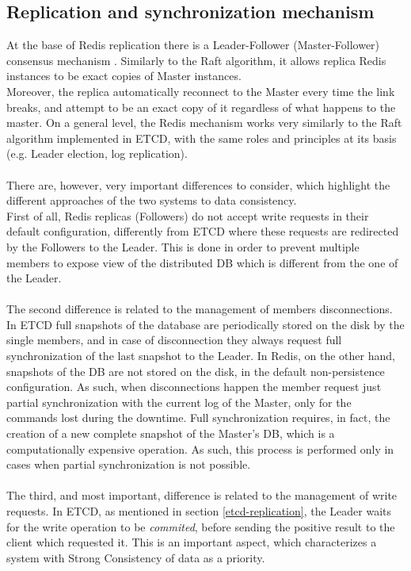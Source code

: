 \pagebreak

\subsection{Replication and synchronization mechanism}
At the base of Redis replication there is a Leader-Follower (Master-Follower) consensus mechanism \cite{site:redis-replication}. Similarly to the Raft algorithm, it allows replica Redis instances to be exact copies of Master instances. \\
Moreover, the replica automatically reconnect to the Master every time the link breaks, and attempt to be an exact copy of it regardless of what happens to the master. On a general level, the Redis mechanism works very similarly to the Raft algorithm implemented in ETCD, with the same roles and principles at its basis (e.g. Leader election, log replication). \\ \\
There are, however, very important differences to consider, which highlight the different approaches of the two systems to data consistency. \\
First of all, Redis replicas (Followers) do not accept write requests in their default configuration, differently from ETCD where these requests are redirected by the Followers to the Leader. This is done in order to prevent multiple members to expose view of the distributed DB which is different from the one of the Leader. \\ \\
The second difference is related to the management of members disconnections. In ETCD full snapshots of the database are periodically stored on the disk by the single members, and in case of disconnection they always request full synchronization of the last snapshot to the Leader. In Redis, on the other hand, snapshots of the DB are not stored on the disk, in the default non-persistence configuration. As such, when disconnections happen the member request just partial synchronization with the current log of the Master, only for the commands lost during the downtime. Full synchronization requires, in fact, the creation of a new complete snapshot of the Master's DB, which is a computationally expensive operation. As such, this process is performed only in cases when partial synchronization is not possible. \\ \\
The third, and most important, difference is related to the management of write requests. In ETCD, as mentioned in section \ref{etcd-replication}, the Leader waits for the write operation to be \textit{commited}, before sending the positive result to the client which requested it. This is an important aspect, which characterizes a system with Strong Consistency of data as a priority. \\
